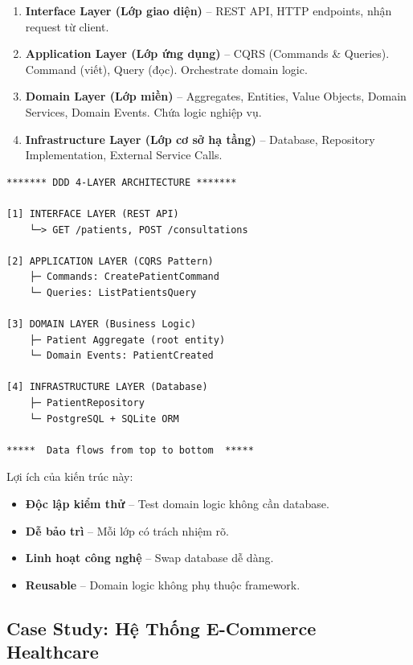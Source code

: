 \documentclass[12pt,a4paper]{article}
\begin{document}
\begin{enumerate}
    \item \textbf{Interface Layer (Lớp giao diện)} – REST API, HTTP endpoints, nhận request từ client.
    
    \item \textbf{Application Layer (Lớp ứng dụng)} – CQRS (Commands \& Queries). Command (viết), Query (đọc). Orchestrate domain logic.
    
    \item \textbf{Domain Layer (Lớp miền)} – Aggregates, Entities, Value Objects, Domain Services, Domain Events. Chứa logic nghiệp vụ.
    
    \item \textbf{Infrastructure Layer (Lớp cơ sở hạ tầng)} – Database, Repository Implementation, External Service Calls.
\end{enumerate}

\begin{verbatim}
******* DDD 4-LAYER ARCHITECTURE *******

[1] INTERFACE LAYER (REST API)
    └─> GET /patients, POST /consultations
    
[2] APPLICATION LAYER (CQRS Pattern)
    ├─ Commands: CreatePatientCommand
    └─ Queries: ListPatientsQuery
    
[3] DOMAIN LAYER (Business Logic)
    ├─ Patient Aggregate (root entity)
    └─ Domain Events: PatientCreated
    
[4] INFRASTRUCTURE LAYER (Database)
    ├─ PatientRepository
    └─ PostgreSQL + SQLite ORM
    
*****  Data flows from top to bottom  *****
\end{verbatim}

Lợi ích của kiến trúc này:
\begin{itemize}
    \item \textbf{Độc lập kiểm thử} – Test domain logic không cần database.
    \item \textbf{Dễ bảo trì} – Mỗi lớp có trách nhiệm rõ.
    \item \textbf{Linh hoạt công nghệ} – Swap database dễ dàng.
    \item \textbf{Reusable} – Domain logic không phụ thuộc framework.
\end{itemize}

\subsection{Case Study: Hệ Thống E-Commerce Healthcare}
\end{document}
